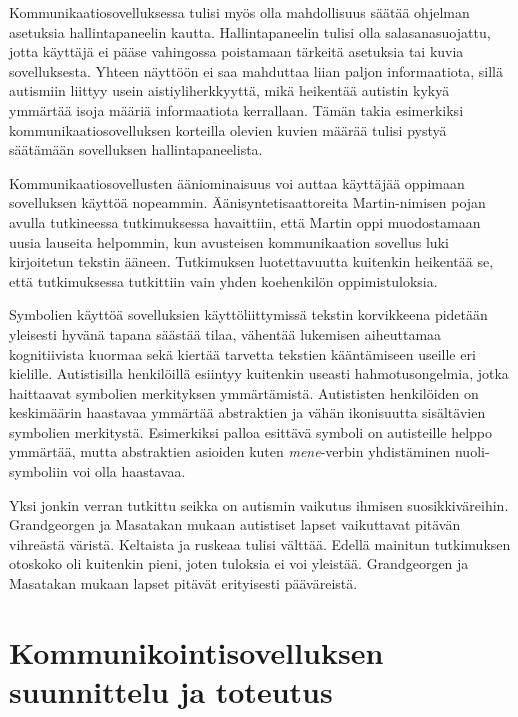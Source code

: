\documentclass[utf8]{gradu3}
\begin{document}
\label{AAC-settings}
Kommunikaatiosovelluksessa tulisi myös olla mahdollisuus säätää ohjelman asetuksia hallintapaneelin kautta. Hallintapaneelin tulisi olla salasanasuojattu, jotta käyttäjä ei pääse vahingossa poistamaan tärkeitä asetuksia tai kuvia sovelluksesta. Yhteen näyttöön ei saa mahduttaa liian paljon informaatiota, sillä autismiin liittyy usein aistiyliherkkyyttä, mikä heikentää autistin kykyä ymmärtää isoja määriä informaatiota kerrallaan. Tämän takia esimerkiksi kommunikaatiosovelluksen korteilla olevien kuvien määrää tulisi pystyä säätämään sovelluksen hallintapaneelista. \label{AAC-cardsize}

\label{AAC-soundsynth}
Kommunikaatiosovellusten ääniominaisuus voi auttaa käyttäjää oppimaan sovelluksen käyttöä nopeammin. Äänisyntetisaattoreita Martin-nimisen pojan avulla tutkineessa tutkimuksessa \parencite[]{voca-efficacy} havaittiin, että Martin oppi muodostamaan uusia lauseita helpommin, kun avusteisen kommunikaation sovellus luki kirjoitetun tekstin ääneen. Tutkimuksen luotettavuutta kuitenkin heikentää se, että tutkimuksessa tutkittiin vain yhden koehenkilön oppimistuloksia.

\label{symbol-libraries}
Symbolien käyttöä sovelluksien käyttöliittymissä tekstin korvikkeena pidetään yleisesti hyvänä tapana säästää tilaa, vähentää lukemisen aiheuttamaa kognitiivista kuormaa sekä kiertää tarvetta tekstien kääntämiseen useille eri kielille. Autistisilla henkilöillä esiintyy kuitenkin useasti hahmotusongelmia, jotka haittaavat symbolien merkityksen ymmärtämistä. Autististen henkilöiden on keskimäärin haastavaa ymmärtää abstraktien ja vähän ikonisuutta sisältävien symbolien merkitystä. \label{AAC-abstract-symbols} Esimerkiksi palloa esittävä symboli on autisteille helppo ymmärtää, mutta abstraktien asioiden kuten \textit{mene}-verbin yhdistäminen nuoli-symboliin voi olla haastavaa. \parencite[]{symbol-acquisition-autism}

\label{AAC-colors}
Yksi jonkin verran tutkittu seikka on autismin vaikutus ihmisen suosikkiväreihin. Grandgeorgen ja Masatakan \parencite[]{color-preference-autism} mukaan autistiset lapset vaikuttavat pitävän vihreästä väristä. Keltaista ja ruskeaa tulisi välttää. Edellä mainitun tutkimuksen otoskoko oli kuitenkin pieni, joten tuloksia ei voi yleistää. Grandgeorgen ja Masatakan mukaan lapset pitävät erityisesti pääväreistä.

\chapter{Kommunikointisovelluksen suunnittelu ja toteutus}
\end{document}
